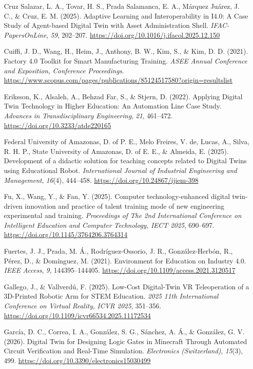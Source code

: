 Cruz Salazar, L. A., Tovar, H. S., Prada Salamanca, E. A., Márquez
Juárez, J. C., \& Cruz, E. M. (2025). Adaptive Learning and
Interoperability in I4.0: A Case Study of Agent-based Digital Twin with
Asset Administration Shell. \emph{IFAC-PapersOnLine}, \emph{59}, 202--207.
\url{https://doi.org/10.1016/j.ifacol.2025.12.150}

Cuiffi, J. D., Wang, H., Heim, J., Anthony, B. W., Kim, S., \& Kim, D. D.
(2021). Factory 4.0 Toolkit for Smart Manufacturing Training. \emph{ASEE
Annual Conference and Exposition, Conference Proceedings}.
\url{https://www.scopus.com/pages/publications/85124517580?origin=resultslist}

Eriksson, K., Alsaleh, A., Behzad Far, S., \& Stjern, D. (2022). Applying
Digital Twin Technology in Higher Education: An Automation Line Case
Study. \emph{Advances in Transdisciplinary Engineering}, \emph{21}, 461--472.
\url{https://doi.org/10.3233/atde220165}

Federal University of Amazonas, D. of P. E., Melo Freires, V. de, Lucas,
A., Silva, R. H. P., State University of Amazonas, D. of E. E., \&
Almeida, E. (2025). Development of a didactic solution for teaching
concepts related to Digital Twins using Educational Robot.
\emph{International Journal of Industrial Engineering and Management},
\emph{16}(4), 444--458. \url{https://doi.org/10.24867/ijiem-398}

Fu, X., Wang, Y., \& Fan, Y. (2025). Computer technology-enhanced digital
twin-driven innovation and practice of talent training mode of new
engineering experimental and training. \emph{Proceedings of The 2nd
International Conference on Intelligent Education and Computer
Technology, IECT 2025}, 690--697.
\url{https://doi.org/10.1145/3764206.3764314}

Fuertes, J. J., Prada, M. Á., Rodríguez-Ossorio, J. R., González-Herbón,
R., Pérez, D., \& Domínguez, M. (2021). Environment for Education on
Industry 4.0. \emph{IEEE Access}, \emph{9}, 144395--144405.
\url{https://doi.org/10.1109/access.2021.3120517}

Gallego, J., \& Vallverdú, F. (2025). Low-Cost Digital-Twin VR
Teleoperation of a 3D-Printed Robotic Arm for STEM Education. \emph{2025 11th
International Conference on Virtual Reality, ICVR 2025}, 351--356.
\url{https://doi.org/10.1109/icvr66534.2025.11172534}

García, D. C., Correa, I. A., González, S. G., Sánchez, A. Á., \&
González, G. V. (2026). Digital Twin for Designing Logic Gates in
Minecraft Through Automated Circuit Verification and Real-Time
Simulation. \emph{Electronics (Switzerland)}, \emph{15}(3), 499.
\url{https://doi.org/10.3390/electronics15030499}

